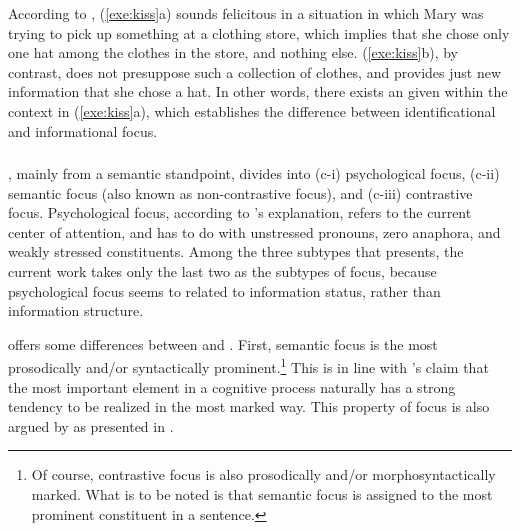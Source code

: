 

\noindent According to \citeauthor{kiss:98}, (\ref{exe:kiss}a) sounds
felicitous in a situation in which Mary was trying to pick up
something at a clothing store, which implies that she chose only one
hat among the clothes in the store, and nothing
else. (\ref{exe:kiss}b), by contrast, does not presuppose such a
collection of clothes, and provides just new information that she
chose a hat. In other words, there exists an  given
within the context in (\ref{exe:kiss}a), which establishes the
difference between identificational  and informational focus.



\subsubsection{\citet{gundel:99}}
\label{3:sssec:gundel}


\citeauthor{gundel:99}, mainly from a semantic standpoint, divides
 into (c-i) psychological focus, (c-ii) semantic focus
(also known as non-contrastive focus), and (c-iii) contrastive
focus. Psychological focus, according to \citeauthor{gundel:99}'s
explanation, refers to the current center of attention, and has to do
with unstressed pronouns, zero anaphora, and weakly stressed
constituents.  Among the three subtypes that \citeauthor{gundel:99}
presents, the current work takes only the last two as the subtypes of
focus, because psychological focus seems to related to information
status, rather than information structure.






\citeauthor{gundel:99} offers some differences between 
and .  First, semantic focus is the most
prosodically and/or syntactically prominent.\footnote{Of course,
  contrastive focus is also prosodically and/or morphosyntactically
  marked. What is to be noted is that semantic focus is assigned to
  the most prominent constituent in a sentence.} This is in line with
\citeauthor{givon:91}'s claim that the most important element in a
cognitive process naturally has a strong tendency to be realized in
the most marked way. This property of focus is also argued by
\citet{buring:10} as presented in .

